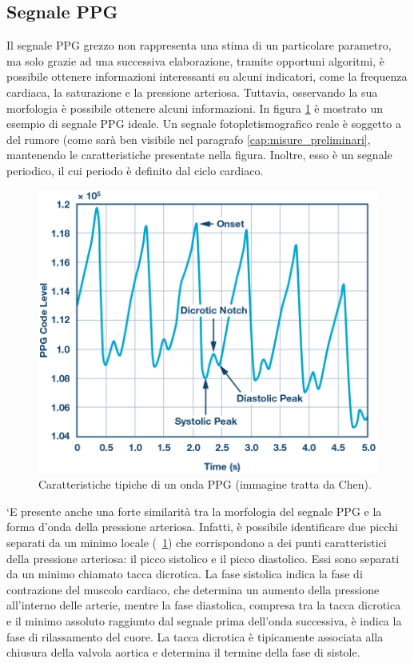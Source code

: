\subsection{Segnale PPG}
Il segnale PPG grezzo non rappresenta una stima di un particolare parametro, ma solo grazie ad una successiva elaborazione, tramite opportuni algoritmi, è possibile ottenere informazioni interessanti su alcuni indicatori, come la frequenza cardiaca, la saturazione e la pressione arteriosa.
Tuttavia, osservando la sua morfologia è possibile ottenere alcuni informazioni\cite{Foroozan2018}. In figura \ref{fig:Descrizione_Segnale_PPG} è mostrato un esempio di segnale PPG ideale. Un segnale fotopletismografico reale è soggetto a del rumore (come sarà ben visibile nel paragrafo \ref{cap:misure_preliminari}, mantenendo le caratteristiche presentate nella figura. Inoltre, esso è un segnale periodico, il cui periodo è definito dal ciclo cardiaco.
\begin{figure}[t]
	\centering
	\includegraphics[width=0.7\linewidth]{ImageFiles/Misure Preliminari/descrizione_segnale_ppg}
	\caption{Caratteristiche tipiche di un onda PPG (immagine tratta da Chen\cite{Ppgsignal}).}
	\label{fig:Descrizione_Segnale_PPG}
\end{figure}
`E presente anche una forte similarità tra la morfologia del segnale PPG e la forma d'onda della pressione arteriosa. Infatti, è possibile identificare due picchi separati da un minimo locale (\Fig~\ref{fig:Descrizione_Segnale_PPG}) che corrispondono a dei punti caratteristici della pressione arteriosa: il picco sistolico e il picco diastolico. Essi sono separati da un minimo chiamato tacca dicrotica. La fase sistolica indica la fase di contrazione del muscolo cardiaco, che determina un aumento della pressione all'interno delle arterie, mentre la fase diastolica, compresa tra la tacca dicrotica e il minimo assoluto raggiunto dal segnale prima dell'onda successiva, è indica la fase di rilassamento del cuore\cite{Singh2017}. La tacca dicrotica è tipicamente associata alla chiusura della valvola aortica e determina il termine della fase di sistole\cite{Gamrah2020}.

